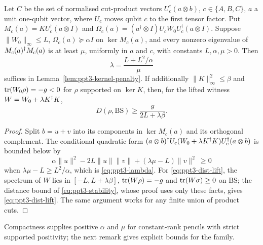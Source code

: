 \begin{proposition}\label{prop:ppt3-kernel-quant}
Let $C$ be the set of normalised cut-product vectors $U_c^\dagger(a\otimes b)$, $c\in\{A,B,C\}$, $a$ a unit
one-qubit vector, where $U_c$ moves qubit $c$ to the first tensor factor. Put
$M_c(a)=KU_c^\dagger(a\otimes I)$ and $\Omega_c(a)=(a^\dagger\otimes I)U_cW_0U_c^\dagger(a\otimes I)$. Suppose
$\|W_0\|_\infty\le L$, $\Omega_c(a)\succeq\alpha I$ on $\ker M_c(a)$, and every nonzero eigenvalue of $M_c(a)^{\dagger} M_c(a)$ is at least
$\mu$, uniformly in $a$ and $c$, with constants $L,\alpha,\mu>0$. Then
\begin{equation}\label{eq:ppt3-lambda}
\lambda=\frac{L+L^2/\alpha}{\mu}
\end{equation}
suffices in Lemma~\ref{lem:ppt3-kernel-penalty}. If additionally $\|K\|_\infty^2\le\beta$ and $\operatorname{tr}(W_0\rho)=-g<0$ for $\rho$
supported on $\ker K$, then, for the lifted witness $W=W_0+\lambda K^{\dagger} K$,
\begin{equation}\label{eq:ppt3-dist-lift}
D(\rho,\mathrm{BS})\ge\frac g{2L+\lambda\beta}.
\end{equation}
\end{proposition}
\begin{proof}
Split $b=u+v$ into its components in $\ker M_c(a)$ and its orthogonal complement. The conditional quadratic form
$(a\otimes b)^{\dagger} U_c(W_0+\lambda K^{\dagger} K)U_c^{\dagger}(a\otimes b)$ is bounded below by
\[
\alpha\|u\|^2-2L\|u\|\|v\|+(\lambda\mu-L)\|v\|^2\ \ge0
\]
when $\lambda\mu-L\ge L^2/\alpha$, which is \eqref{eq:ppt3-lambda}. For \eqref{eq:ppt3-dist-lift}, the spectrum of $W$
lies in $[-L,L+\lambda\beta]$, $\operatorname{tr}(W\rho)=-g$ and $\operatorname{tr}(W\sigma)\ge0$ on $\mathrm{BS}$; the distance bound of
\eqref{eq:ppt3-stability}, whose proof uses only these facts, gives \eqref{eq:ppt3-dist-lift}. The same argument works for any finite union of
product cuts.
\end{proof}

Compactness supplies positive $\alpha$ and $\mu$ for constant-rank pencils with strict supported positivity; the next
remark gives explicit bounds for the family.


